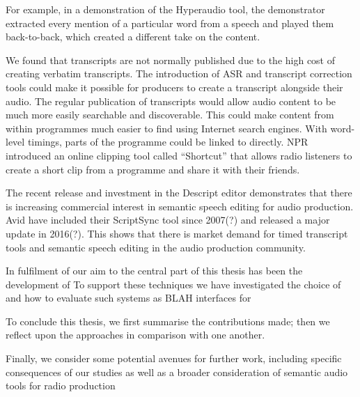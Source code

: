 For example, in a demonstration of the Hyperaudio tool, the demonstrator extracted every mention of a particular word
from a speech and played them back-to-back, which created a different take on the content.

We found that transcripts are not normally published due to the high cost of creating verbatim transcripts. The
introduction of ASR and transcript correction tools could make it possible for producers to create a transcript
alongside their audio. The regular publication of transcripts would allow audio content to be much more easily
searchable and discoverable. This could make content from within programmes much easier to find using Internet search
engines. With word-level timings, parts of the programme could be linked to directly. NPR introduced an online clipping
tool called ``Shortcut'' \citep{Friedhoff2016} that allows radio listeners to create a short clip from a programme and
share it with their friends. 

The recent release and investment in the Descript editor demonstrates that there is increasing commercial interest in
semantic speech editing for audio production. Avid have included their ScriptSync tool since 2007(?) and released a
major update in 2016(?). This shows that there is market demand for timed transcript tools and semantic speech editing
in the audio production community.





In fulfilment of our aim to
the central part of this thesis has been the development of
To support these techniques we have investigated the choice of
and how to evaluate such systems as BLAH interfaces for 

To conclude this thesis, we first summarise the contributions made; then we reflect upon the approaches in comparison
with one another.

Finally, we consider some potential avenues for further work, including specific consequences of our studies as well as
a broader consideration of semantic audio tools for radio production






